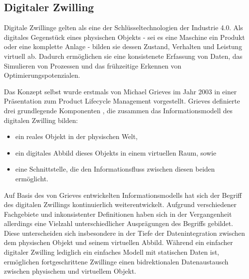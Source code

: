 


\newpage
\subsection{Digitaler Zwilling}
Digitale Zwillinge gelten als eine der Schlüsseltechnologien der Industrie 4.0.
Als digitales Gegenstück eines physischen Objekts - sei es eine Maschine ein Produkt oder eine komplette Anlage - bilden sie dessen Zustand, Verhalten und Leistung virtuell ab.
Dadurch ermöglichen sie eine konsistenete Erfassung von Daten, das Simulieren von Prozessen und das frühzeitige Erkennen von Optimierungspotenzialen.

Das Konzept selbst wurde erstmals von Michael Grieves im Jahr 2003 in einer Präsentation zum Product Lifecycle Management vorgestellt. 
Grieves definierte drei grundlegende Komponenten \cite{DTGrieves} , die zusammen das Informationsmodell des digitalen Zwilling bilden:
\begin{itemize}
    \item ein reales Objekt in der physischen Welt,
    \item ein digitales Abbild dieses Objekts in einem virtuellen Raum, sowie
    \item eine Schnittstelle, die den Informationsfluss zwischen diesen beiden ermöglicht.
\end{itemize}

Auf Basis des von Grieves entwickelten Informationsmodells hat sich der Begriff des digitalen Zwillings kontinuierlich weiterentwickelt.
Aufgrund verschiedener Fachgebiete und inkonsistenter Definitionen haben sich in der Vergangenheit allerdings eine Vielzahl unterschiedlicher Ausprägungen des Begriffs gebildet.
Diese unterscheiden sich insbesondere in der Tiefe der Datenintegration zwischen dem physischen Objekt und seinem virtuellen Abbild.
Während ein einfacher digitaler Zwilling lediglich ein einfaches Modell mit statischen Daten ist, ermöglichen fortgeschrittene Zwillinge einen bidrektionalen Datenaustausch zwischen physischem und virtuellem Objekt. 

